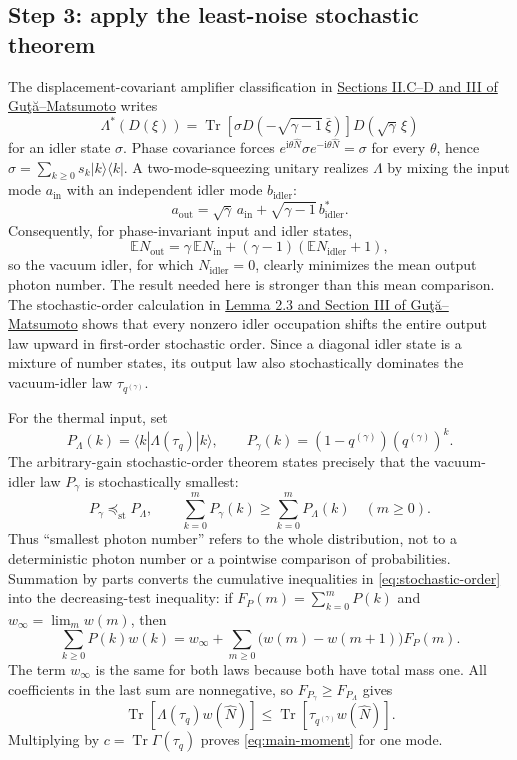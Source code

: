 \documentclass[11pt]{article}
\newcommand{\Tr}{\operatorname{Tr}}
\begin{document}
\subsection*{Step 3: apply the least-noise stochastic theorem}

The displacement-covariant amplifier classification in
\href{https://www.maths.nottingham.ac.uk/plp/pmzmig/preprints/cloning.pdf}
{Sections II.C--D and III of Gu\c{t}\u{a}--Matsumoto} writes
\begin{equation}\label{eq:idler-characterization}
  \Lambda^*(D(\xi))
  =\Tr[\sigma D(-\sqrt{\gamma-1}\,\bar\xi)]
    D(\sqrt\gamma\,\xi)
\end{equation}
for an idler state $\sigma$.  Phase covariance forces
$e^{\mathrm i\theta\widehat N}\sigma e^{-\mathrm i\theta\widehat N}=\sigma$
for every $\theta$, hence $\sigma=\sum_{k\geq0}s_k|k\rangle\langle k|$.
A two-mode-squeezing unitary realizes \(\Lambda\) by mixing the input mode
\(a_{\mathrm{in}}\) with an independent idler mode \(b_{\mathrm{idler}}\):
\[
  a_{\mathrm{out}}
  =\sqrt\gamma\,a_{\mathrm{in}}+\sqrt{\gamma-1}\,b_{\mathrm{idler}}^*.
\]
Consequently, for phase-invariant input and idler states,
\[
  \mathbb E N_{\mathrm{out}}
  =\gamma\,\mathbb E N_{\mathrm{in}}
   +(\gamma-1)(\mathbb E N_{\mathrm{idler}}+1),
\]
so the vacuum idler, for which $N_{\mathrm{idler}}=0$, clearly minimizes
the mean output photon number.  The result needed here is stronger than this
mean comparison.  The stochastic-order calculation in
\href{https://www.maths.nottingham.ac.uk/plp/pmzmig/preprints/cloning.pdf}
{Lemma 2.3 and Section III of Gu\c{t}\u{a}--Matsumoto} shows
that every nonzero idler occupation shifts the entire output law upward in
first-order stochastic order.  Since a diagonal idler state is a mixture of
number states, its output law also stochastically dominates the vacuum-idler
law $\tau_{q^{(\gamma)}}$.

For the thermal input, set
\[
  P_\Lambda(k)=\langle k|\Lambda(\tau_q)|k\rangle,
  \qquad
  P_\gamma(k)=(1-q^{(\gamma)})(q^{(\gamma)})^k.
\]
The arbitrary-gain stochastic-order theorem states precisely that the
vacuum-idler law $P_\gamma$ is stochastically smallest:
\begin{equation}\label{eq:stochastic-order}
  P_\gamma\preceq_{\mathrm{st}}P_\Lambda,
  \qquad
  \sum_{k=0}^mP_\gamma(k)\geq
  \sum_{k=0}^mP_\Lambda(k)
  \quad(m\geq0).
\end{equation}
Thus ``smallest photon number'' refers to the whole distribution, not to a
deterministic photon number or a pointwise comparison of probabilities.
Summation by parts converts the cumulative inequalities in
\eqref{eq:stochastic-order} into the decreasing-test inequality: if
$F_P(m)=\sum_{k=0}^mP(k)$ and $w_\infty=\lim_mw(m)$, then
\[
  \sum_{k\geq0}P(k)w(k)
  =w_\infty+
   \sum_{m\geq0}\bigl(w(m)-w(m+1)\bigr)F_P(m).
\]
The term $w_\infty$ is the same for both laws because both have total mass
one.  All coefficients in the last sum are nonnegative, so
$F_{P_\gamma}\geq F_{P_\Lambda}$ gives
\[
  \Tr[\Lambda(\tau_q)w(\widehat N)]
  \leq
  \Tr[\tau_{q^{(\gamma)}}w(\widehat N)].
\]
Multiplying by $c=\Tr\Gamma(\tau_q)$ proves
\eqref{eq:main-moment} for one mode.
\end{document}
